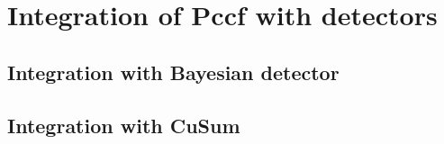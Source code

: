 \chapter{Integration of Pccf with detectors}
\section{Integration with Bayesian detector}


\section{Integration with CuSum}
